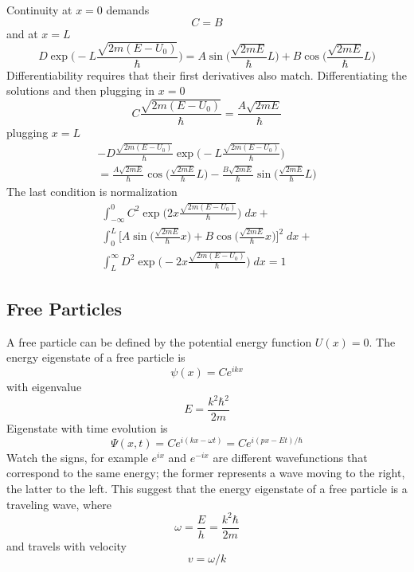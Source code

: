 \documentclass[../main.tex]{subfiles}
\begin{document}
Continuity at $x=0$ demands
\begin{equation*}
    C=B
\end{equation*}
and at $x=L$
\begin{equation*}
    D\exp\biggl( -L{\frac{\sqrt{2m(E-U_0)}}{\hbar}} \biggr)=A\sin \biggl(\frac{\sqrt{2mE}}{\hbar} L\biggr)+ B \cos \biggl(\frac{\sqrt{2mE}}{\hbar} L\biggr)
\end{equation*}
Differentiability requires that their first derivatives also match. Differentiating the solutions and then plugging in $x=0$
\begin{equation*}
    C\frac{\sqrt{2m(E-U_0)}}{\hbar}=\frac{A\sqrt{2mE}}{\hbar}
\end{equation*}
plugging $x=L$
\begin{multline*}
    -D{\frac{\sqrt{2m(E-U_0)}}{\hbar}}\exp\biggl( -L{\frac{\sqrt{2m(E-U_0)}}{\hbar}} \biggr)\\=  \frac{A\sqrt{2mE}}{\hbar} \cos \biggl(\frac{\sqrt{2mE}}{\hbar} L\biggr)-\frac{B\sqrt{2mE}}{\hbar} \sin \biggl(\frac{\sqrt{2mE}}{\hbar} L\biggr)
\end{multline*}
The last condition is normalization
\begin{multline*}
    \int_{-\infty}^{0}C^2\exp\biggl( 2x{\frac{\sqrt{2m(E-U_0)}}{\hbar}} \biggr)\;dx+\\ \int_{0}^{L}\biggl[ A\sin \biggl(\frac{\sqrt{2mE}}{\hbar} x\biggr)+ B \cos \biggl(\frac{\sqrt{2mE}}{\hbar} x\biggr) \biggr]^2\;dx + \\ \int_{L}^{\infty} D^2\exp\biggl( -2x{\frac{\sqrt{2m(E-U_0)}}{\hbar}} \biggr)\;dx=1
\end{multline*}

\subsection*{Free Particles}
A free particle can be defined by the potential energy function $U(x) = 0$. The energy eigenstate of a free particle is
\begin{equation*}
    \psi(x) = Ce^{ikx}
\end{equation*}
with eigenvalue
\begin{equation*}
    E=\frac{k^2\hbar^2}{2m}
\end{equation*}
Eigenstate with time evolution is
\begin{equation*}
    \Psi(x,t)=Ce^{i(kx-\omega t)} = Ce^{i(px-Et)/\hbar}
\end{equation*}
Watch the signs, for example $e^{ix}$ and $e^{-ix}$ are different wavefunctions that correspond to the same energy; the former represents a wave moving to the right, the latter to the left. This suggest that the energy eigenstate of a free particle is a traveling wave, where
\begin{equation*}
    \omega=\frac{E}{h}=\frac{k^2\hbar}{2m}
\end{equation*} 
and travels with velocity \begin{equation*}
    v=\omega/k
\end{equation*}
\end{document}
